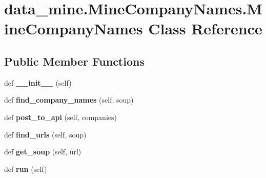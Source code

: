 \hypertarget{classdata__mine_1_1_mine_company_names_1_1_mine_company_names}{}\section{data\+\_\+mine.\+Mine\+Company\+Names.\+Mine\+Company\+Names Class Reference}
\label{classdata__mine_1_1_mine_company_names_1_1_mine_company_names}
\subsection*{Public Member Functions}
\begin{DoxyCompactItemize}
\item 
\mbox{\label{classdata__mine_1_1_mine_company_names_1_1_mine_company_names_a97f2a5d06a1cdeb94818272def03e6ad}} 
def {\bfseries \+\_\+\+\_\+init\+\_\+\+\_\+} (self)
\item 
\mbox{\label{classdata__mine_1_1_mine_company_names_1_1_mine_company_names_a2dfa3d83f4ce40299b4daa5fd436865a}} 
def {\bfseries find\+\_\+company\+\_\+names} (self, soup)
\item 
\mbox{\label{classdata__mine_1_1_mine_company_names_1_1_mine_company_names_aba839cc008e97f6275cfe189b907dc79}} 
def {\bfseries post\+\_\+to\+\_\+api} (self, companies)
\item 
\mbox{\label{classdata__mine_1_1_mine_company_names_1_1_mine_company_names_a8cb5cf8d03ad0cb7232fa605bc4f714e}} 
def {\bfseries find\+\_\+urls} (self, soup)
\item 
\mbox{\label{classdata__mine_1_1_mine_company_names_1_1_mine_company_names_a6f2a4b9f458f29df5041f9ed038b2c55}} 
def {\bfseries get\+\_\+soup} (self, url)
\item 
\mbox{\label{classdata__mine_1_1_mine_company_names_1_1_mine_company_names_a8bbd851be671d9eb982bec2d61ee9258}} 
def {\bfseries run} (self)
\end{DoxyCompactItemize}
